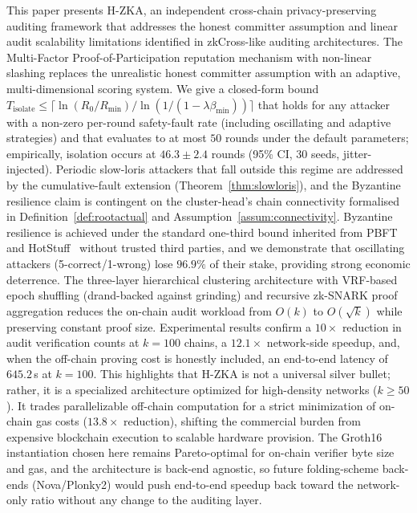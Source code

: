 \documentclass[journal]{IEEEtran}
\begin{document}
This paper presents H-ZKA, an independent cross-chain privacy-preserving auditing framework that addresses the honest committer assumption and linear audit scalability limitations identified in zkCross-like auditing architectures. The Multi-Factor Proof-of-Participation reputation mechanism with non-linear slashing replaces the unrealistic honest committer assumption with an adaptive, multi-dimensional scoring system. We give a closed-form bound $T_{\mathrm{isolate}} \le \lceil \ln(R_0/R_{\min})/\ln(1/(1-\lambda\beta_{\min})) \rceil$ that holds for any attacker with a non-zero per-round safety-fault rate (including oscillating and adaptive strategies) and that evaluates to at most $50$ rounds under the default parameters; empirically, isolation occurs at $46.3 \pm 2.4$ rounds (95\% CI, 30 seeds, jitter-injected). Periodic slow-loris attackers that fall outside this regime are addressed by the cumulative-fault extension (Theorem~\ref{thm:slowloris}), and the Byzantine resilience claim is contingent on the cluster-head's chain connectivity formalised in Definition~\ref{def:rootactual} and Assumption~\ref{assum:connectivity}. Byzantine resilience is achieved under the standard one-third bound inherited from PBFT~\cite{castro1999pbft} and HotStuff~\cite{yin2019hotstuff} without trusted third parties, and we demonstrate that oscillating attackers (5-correct/1-wrong) lose $96.9\%$ of their stake, providing strong economic deterrence. The three-layer hierarchical clustering architecture with VRF-based epoch shuffling (drand-backed against grinding) and recursive zk-SNARK proof aggregation reduces the on-chain audit workload from $O(k)$ to $O(\sqrt{k})$ while preserving constant proof size. Experimental results confirm a $10\times$ reduction in audit verification counts at $k = 100$ chains, a $12.1\times$ network-side speedup, and, when the off-chain proving cost is honestly included, an end-to-end latency of $645.2\,$s at $k = 100$. This highlights that H-ZKA is not a universal silver bullet; rather, it is a specialized architecture optimized for high-density networks ($k \ge 50$). It trades parallelizable off-chain computation for a strict minimization of on-chain gas costs ($13.8\times$ reduction), shifting the commercial burden from expensive blockchain execution to scalable hardware provision. The Groth16 instantiation chosen here remains Pareto-optimal for on-chain verifier byte size and gas, and the architecture is back-end agnostic, so future folding-scheme back-ends (Nova/Plonky2) would push end-to-end speedup back toward the network-only ratio without any change to the auditing layer.
\end{document}
